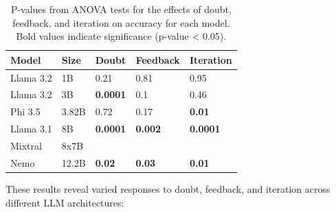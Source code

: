 \begin{table}[ht]
  \centering
  \small
  \begin{tabular}{|l|l|l|l|l|}
    \hline
    \textbf{Model} & \textbf{Size} & \textbf{Doubt} & \textbf{Feedback} & \textbf{Iteration} \\
    \hline
    Llama 3.2 & 1B & 0.21 & 0.81 & 0.95 \\
    Llama 3.2 & 3B & \textbf{0.0001} & 0.1 & 0.46 \\
    Phi 3.5 & 3.82B & 0.72 & 0.17 & \textbf{0.01}\\
    Llama 3.1 & 8B & \textbf{0.0001} & \textbf{0.002} & \textbf{0.0001} \\
    Mixtral & 8x7B & & & \\
    Nemo & 12.2B & \textbf{0.02} & \textbf{0.03} & \textbf{0.01}\\
    \hline
  \end{tabular}
  \caption{P-values from ANOVA tests for the effects of doubt, feedback, and iteration on accuracy for each model. Bold values indicate significance (p-value < 0.05).}
  \label{rep: p-value}
\end{table}

These results reveal varied responses to doubt, feedback, and iteration across different LLM architectures:

